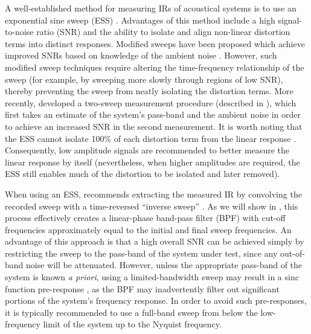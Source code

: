 A well-established method for measuring IRs of acoustical systems is to use an exponential sine sweep (ESS) \citep{Farina2007a,MullerMassarani2001R}.
Advantages of this method include a high signal-to-noise ratio (SNR) and the ability to isolate and align non-linear distortion terms into distinct responses.
Modified sweeps have been proposed which achieve improved SNRs based on knowledge of the ambient noise \citep{OchiaiKaneda2013}.
However, such modified sweep techniques require altering the time-frequency relationship of the sweep (for example, by sweeping more slowly through regions of low SNR), thereby preventing the sweep from neatly isolating the distortion terms.
More recently, \citet{Tylka2014} developed a two-sweep measurement procedure (described in ), which first takes an estimate of the system's pass-band and the ambient noise in order to achieve an increased SNR in the second measurement.
It is worth noting that the ESS cannot isolate 100\% of each distortion term from the linear response \citep{TorrasRosellJacobsen2011}.
Consequently, low amplitude signals are recommended to better measure the linear response by itself (nevertheless, when higher amplitudes are required, the ESS still enables much of the distortion to be isolated and later removed).

When using an ESS, \citeauthor{Farina2007a} recommends extracting the measured IR by convolving the recorded sweep with a time-reversed ``inverse sweep'' \citep{Farina2007a}.
As we will show in , this process effectively creates a linear-phase band-pass filter (BPF) with cut-off frequencies approximately equal to the initial and final sweep frequencies.
An advantage of this approach is that a high overall SNR can be achieved simply by restricting the sweep to the pass-band of the system under test, since any out-of-band noise will be attenuated.
However, unless the appropriate pass-band of the system is known \textit{a priori}, using a limited-bandwidth sweep may result in a sinc function pre-response \citep{Farina2007a}, as the BPF may inadvertently filter out significant portions of the system's frequency response.
In order to avoid such pre-responses, it is typically recommended to use a full-band sweep from below the low-frequency limit of the system up to the Nyquist frequency.

